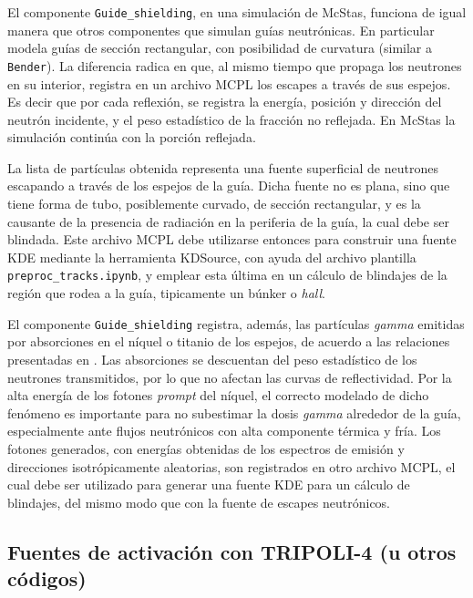 El componente \verb|Guide_shielding|, en una simulación de McStas, funciona de igual manera que otros componentes que simulan guías neutrónicas. En particular modela guías de sección rectangular, con posibilidad de curvatura (similar a \verb|Bender|). La diferencia radica en que, al mismo tiempo que propaga los neutrones en su interior, registra en un archivo MCPL los escapes a través de sus espejos. Es decir que por cada reflexión, se registra la energía, posición y dirección del neutrón incidente, y el peso estadístico de la fracción no reflejada. En McStas la simulación continúa con la porción reflejada.

La lista de partículas obtenida representa una fuente superficial de neutrones escapando a través de los espejos de la guía. Dicha fuente no es plana, sino que tiene forma de tubo, posiblemente curvado, de sección rectangular, y es la causante de la presencia de radiación en la periferia de la guía, la cual debe ser blindada. Este archivo MCPL debe utilizarse entonces para construir una fuente KDE mediante la herramienta KDSource, con ayuda del archivo plantilla \verb|preproc_tracks.ipynb|, y emplear esta última en un cálculo de blindajes de la región que rodea a la guía, tipicamente un búnker o \emph{hall}.

El componente \verb|Guide_shielding| registra, además, las partículas \emph{gamma} emitidas por absorciones en el níquel o titanio de los espejos, de acuerdo a las relaciones presentadas en \cite{abs}. Las absorciones se descuentan del peso estadístico de los neutrones transmitidos, por lo que no afectan las curvas de reflectividad. Por la alta energía de los fotones \emph{prompt} del níquel, el correcto modelado de dicho fenómeno es importante para no subestimar la dosis \emph{gamma} alrededor de la guía, especialmente ante flujos neutrónicos con alta componente térmica y fría. Los fotones generados, con energías obtenidas de los espectros de emisión y direcciones isotrópicamente aleatorias, son registrados en otro archivo MCPL, el cual debe ser utilizado para generar una fuente KDE para un cálculo de blindajes, del mismo modo que con la fuente de escapes neutrónicos.


\subsection{Fuentes de activación con TRIPOLI-4 (u otros códigos)}

